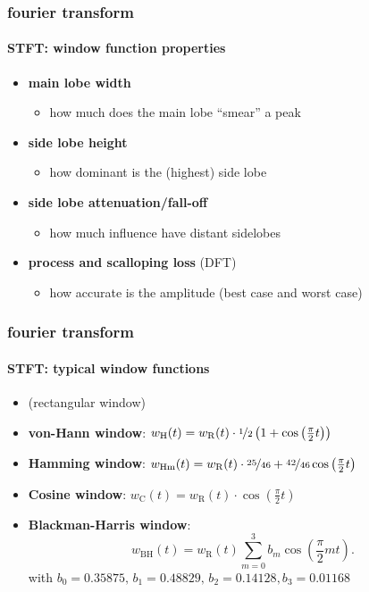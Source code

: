 	\begin{frame}\frametitle{fourier transform}\framesubtitle{STFT: window function properties}
		\begin{itemize}
			\item	\textbf{main lobe width}
                \begin{itemize}
                    \item   how much does the main lobe ``smear'' a peak
                \end{itemize}
            \pause
			\item	\textbf{side lobe height}
                \begin{itemize}
                    \item   how dominant is the (highest) side lobe
                \end{itemize}
			\pause
            \item	\textbf{side lobe attenuation/fall-off}
                \begin{itemize}
                    \item   how much influence have distant sidelobes
                \end{itemize}
            \item   \textbf{process and scalloping loss} (DFT)
                \begin{itemize}
                    \item   how accurate is the amplitude (best case and worst case)
                \end{itemize}
		\end{itemize}
	\end{frame}	

	\begin{frame}\frametitle{fourier transform}\framesubtitle{STFT: typical window functions}
        \begin{itemize}
            \item   (rectangular window)
            \pause
            \smallskip
            \item   \textbf{von-Hann window}: $w_\mathrm{H}(t) = w_\mathrm{R}(t)\cdot\nicefrac{1}{2}\left(1 + \cos\left(\frac{\pi}{2}t\right) \right)$
            \pause
            \smallskip
            \item   \textbf{Hamming window}: $w_\mathrm{Hm}(t) = w_\mathrm{R}(t)\cdot\nicefrac{25}{46} + \nicefrac{42}{46}\cos\left(\frac{\pi}{2}t\right)$
            \pause
            \smallskip
            \item   \textbf{Cosine window}: $w_\mathrm{C}(t) = w_\mathrm{R}(t)\cdot\cos\left(\frac{\pi}{2}t\right)$
            \pause
            \smallskip
            \item   \textbf{Blackman-Harris window}:
                    \begin{equation}
						w_\mathrm{BH}(t) = w_{\mathrm{R}}(t)\sum\limits_{m=0}^{3}{b_m\cos\left(\frac{\pi}{2}mt\right)} .
					\end{equation}
                    with $b_0 = 0.35875,\, b_1 = 0.48829,\, b_2 = 0.14128, b_3 = 0.01168$
        \end{itemize}
	\end{frame}	


